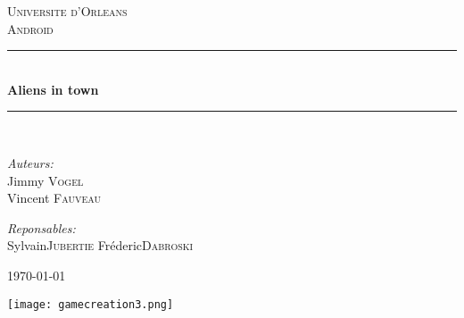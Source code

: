 \documentclass[pdftex,12pt,a4paper]{report}
\newcommand{\HRule} {\rule{\linewidth} {0.5mm}}
\begin{document}
\begin{titlepage}
	\begin{center}
		\textsc{\LARGE Universite d'Orleans }\\[1.5cm]
		\textsc{\LARGE Android}\\[0.5cm]

		\HRule \\[0.4cm]
		{\huge \bfseries Aliens in town}\\[0.3cm]
		\HRule \\[1.5cm]

		\begin{minipage}{0.4\textwidth}
 			\begin{flushleft} \large
  				\emph{Auteurs:}\\
  				Jimmy \textsc{Vogel}\\
  				Vincent \textsc{Fauveau}
			\end{flushleft}
		\end{minipage}
		\begin{minipage}{0.4\textwidth}
 			\begin{flushright}\large
 				\emph{Reponsables:}\\
 				Sylvain\textsc{Jubertie}
 				Fréderic\textsc{Dabroski}
 			\end{flushright}
		\end{minipage}
		\vfill
		{\large \today}
	\end{center}
\end{titlepage}

\tableofcontents


 \centerline{ \texttt{[image: gamecreation3.png]}}


\clearpage




\clearpage

\end{document}
